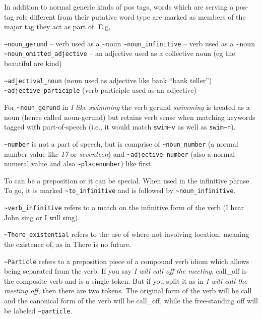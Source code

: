 \documentclass[]{article}
\begin{document}
In addition to normal generic kinds of pos tags, words which are serving
a pos-tag role different from their putative word type are marked as
members of the major tag they act as part of. E.g,

\texttt{\textasciitilde{}noun\_gerund} -- verb used as a
\textasciitilde{}noun \texttt{\textasciitilde{}noun\_infinitive} -- verb
used as a \textasciitilde{}noun
\texttt{\textasciitilde{}noun\_omitted\_adjective} -- an adjective used
as a collective noun (eg the beautiful are kind)

\texttt{\textasciitilde{}adjectival\_noun} (noun used as adjective like
bank ``bank teller'') \texttt{\textasciitilde{}adjective\_participle}
(verb participle used as an adjective)

For \texttt{\textasciitilde{}noun\_gerund} in \emph{I like swimming} the
verb gerund \emph{swimming} is treated as a noun (hence called
noun-gerund) but retains verb sense when matching keywords tagged with
part-of-speech (i.e., it would match \texttt{swim\textasciitilde{}v} as
well as \texttt{swim\textasciitilde{}n}).

\texttt{\textasciitilde{}number} is not a part of speech, but is
comprise of \texttt{\textasciitilde{}noun\_number} (a normal number
value like \emph{17} or \emph{seventeen}) and
\texttt{\textasciitilde{}adjective\_number} (also a normal numeral value
and also \texttt{\textasciitilde{}placenumber}) like first.

To can be a preposition or it can be special. When used in the
infinitive phrase To go, it is marked
\texttt{\textasciitilde{}to\_infinitive} and is followed by
\texttt{\textasciitilde{}noun\_infinitive}.

\texttt{\textasciitilde{}verb\_infinitive} refers to a match on the
infinitive form of the verb (I hear John sing or I will sing).

\texttt{\textasciitilde{}There\_existential} refers to the use of where
not involving location, meaning the existence of, as in There is no
future.

\texttt{\textasciitilde{}Particle} refers to a preposition piece of a
compound verb idiom which allows being separated from the verb. If you
say \emph{I will call off the meeting}, call\_off is the composite verb
and is a single token. But if you split it as in \emph{I will call the
meeting off}, then there are two tokens. The original form of the verb
will be call and the canonical form of the verb will be call\_off, while
the free-standing off will be labeled
\texttt{\textasciitilde{}particle}.
\end{document}
